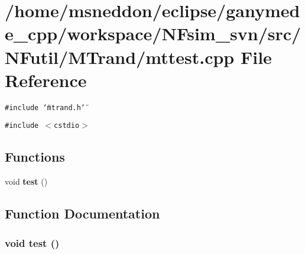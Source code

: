 \section{/home/msneddon/eclipse/ganymede\_\-cpp/workspace/NFsim\_\-svn/src/NFutil/MTrand/mttest.cpp File Reference}
\label{mttest_8cpp}


{\tt \#include \char`\"{}mtrand.h\char`\"{}}\par
{\tt \#include $<$cstdio$>$}\par
\subsection*{Functions}
\begin{CompactItemize}
\item 
void {\bf test} ()
\end{CompactItemize}


\subsection{Function Documentation}
\subsubsection{\setlength{\rightskip}{0pt plus 5cm}void test ()}\label{mttest_8cpp_e1a3968e7947464bee7714f6d43b7002}


